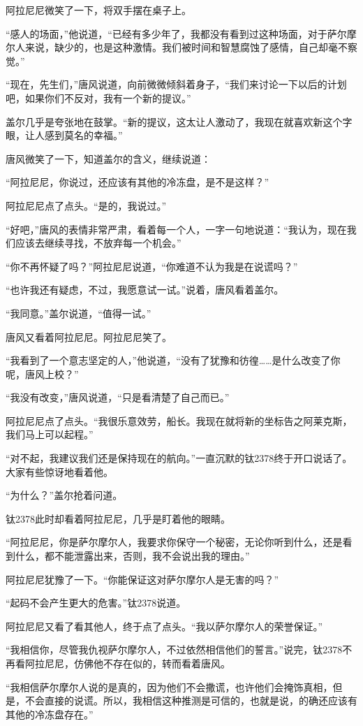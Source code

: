 阿拉尼尼微笑了一下，将双手摆在桌子上。 

“感人的场面，”他说道，“已经有多少年了，我都没有看到过这种场面，对于萨尔摩尔人来说，缺少的，也是这种激情。我们被时间和智慧腐蚀了感情，自己却毫不察觉。” 

“现在，先生们，”唐风说道，向前微微倾斜着身子，“我们来讨论一下以后的计划吧，如果你们不反对，我有一个新的提议。” 

盖尔几乎是夸张地在鼓掌。“新的提议，这太让人激动了，我现在就喜欢新这个字眼，让人感到莫名的幸福。” 

唐风微笑了一下，知道盖尔的含义，继续说道： 

“阿拉尼尼，你说过，还应该有其他的冷冻盘，是不是这样？” 

阿拉尼尼点了点头。“是的，我说过。” 

“好吧，”唐风的表情非常严肃，看着每一个人，一字一句地说道：“我认为，现在我们应该去继续寻找，不放弃每一个机会。” 

“你不再怀疑了吗？”阿拉尼尼说道，“你难道不认为我是在说谎吗？” 

“也许我还有疑虑，不过，我愿意试一试。”说着，唐风看着盖尔。 

“我同意。”盖尔说道，“值得一试。” 

唐风又看着阿拉尼尼。阿拉尼尼笑了。 

“我看到了一个意志坚定的人，”他说道，“没有了犹豫和彷徨……是什么改变了你呢，唐风上校？” 

“我没有改变，”唐风说道，“只是看清楚了自己而已。” 

阿拉尼尼点了点头。“我很乐意效劳，船长。我现在就将新的坐标告之阿莱克斯，我们马上可以起程。” 

“对不起，我建议我们还是保持现在的航向。”一直沉默的钛2378终于开口说话了。大家有些惊讶地看着他。 

“为什么？”盖尔抢着问道。 

钛2378此时却看着阿拉尼尼，几乎是盯着他的眼睛。 

“阿拉尼尼，你是萨尔摩尔人，我要求你保守一个秘密，无论你听到什么，还是看到什么，都不能泄露出来，否则，我不会说出我的理由。” 

阿拉尼尼犹豫了一下。“你能保证这对萨尔摩尔人是无害的吗？” 

“起码不会产生更大的危害。”钛2378说道。 

阿拉尼尼又看了看其他人，终于点了点头。“我以萨尔摩尔人的荣誉保证。” 

“我相信你，尽管我仇视萨尔摩尔人，不过依然相信他们的誓言。”说完，钛2378不再看阿拉尼尼，仿佛他不存在似的，转而看着唐风。 

“我相信萨尔摩尔人说的是真的，因为他们不会撒谎，也许他们会掩饰真相，但是，不会直接的说谎。所以，我相信这种推测是可信的，也就是说，的确还应该有其他的冷冻盘存在。” 

